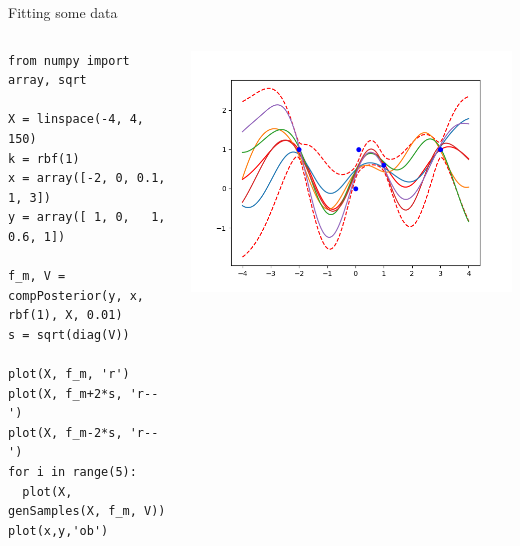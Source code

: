 \documentclass[presentation]{beamer}
\begin{document}
\begin{frame}[fragile,label={sec:orgb14a4b9}]{Fitting some data}
 \begin{columns}
\begin{column}{0.35\columnwidth}
\begin{verbatim}
from numpy import array, sqrt

X = linspace(-4, 4, 150)
k = rbf(1)
x = array([-2, 0, 0.1,   1, 3])
y = array([ 1, 0,   1, 0.6, 1])

f_m, V = compPosterior(y, x, rbf(1), X, 0.01)
s = sqrt(diag(V))

plot(X, f_m, 'r')
plot(X, f_m+2*s, 'r--')
plot(X, f_m-2*s, 'r--')
for i in range(5):
  plot(X, genSamples(X, f_m, V))
plot(x,y,'ob')
\end{verbatim}
\end{column}


\begin{column}{0.55\columnwidth}
\begin{center}
\includegraphics[width=.9\linewidth]{images/fig04.png}
\end{center}
\end{column}
\end{columns}
\end{frame}
\end{document}
